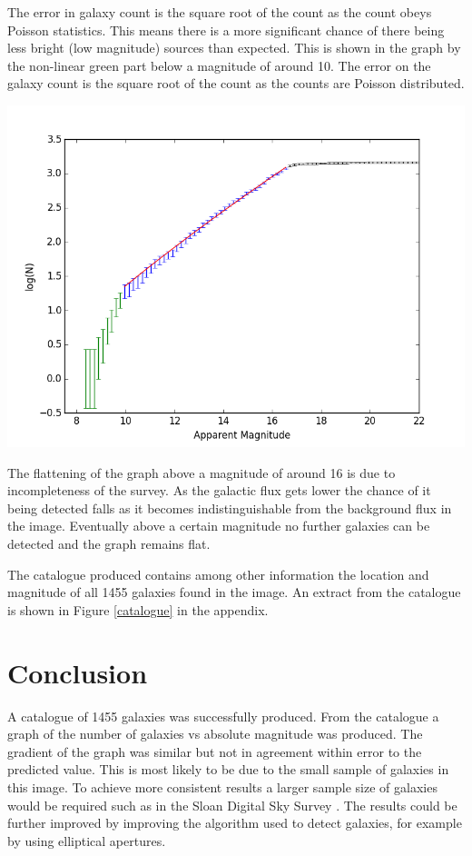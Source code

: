 \documentclass[10pt,a4paper]{article}
\begin{document}
The error in galaxy count is the square root of the count as the count obeys Poisson statistics. This means there is a more significant chance of there being less bright (low magnitude)  sources  than expected.  This is shown in the graph by the non-linear green part below a magnitude of around 10. The error on the galaxy count is the square root of the count as the counts are Poisson distributed.
\begin{center}
\includegraphics [width=10 cm]{graph.png}
\label{galaxy_counts}
\end{center}
The flattening of the graph above a magnitude of around 16  is due to incompleteness of the survey. As the galactic flux gets lower the chance of it being detected falls as it becomes indistinguishable from the background flux in the image. Eventually above a certain magnitude no further galaxies can be detected and the graph remains flat.

The catalogue produced contains among other information the location and magnitude of all 1455 galaxies found in the image. An extract from the catalogue is shown in Figure \ref{catalogue} in the appendix.

\section*{Conclusion}
A catalogue of 1455 galaxies was successfully produced. From the catalogue a graph of the number of galaxies vs absolute magnitude was produced. The gradient of the graph was similar but not in agreement within error to the predicted value. This is most likely to be due to the small sample of galaxies in this image. To achieve more consistent results a larger sample size of galaxies would be required such as in the  Sloan Digital Sky Survey \cite{paper}. The results could be further improved by improving the algorithm used to detect galaxies, for example by using elliptical apertures.
\end{document}
